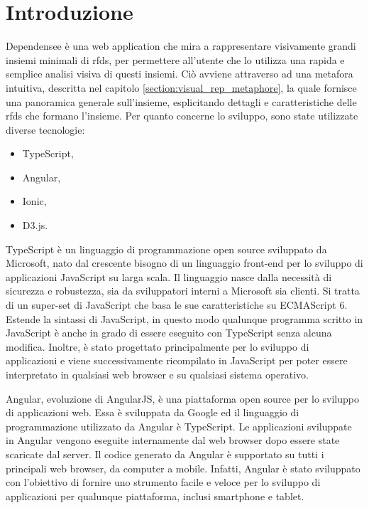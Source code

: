 \section{Introduzione} %
Dependensee \`{e} una web application che mira a rappresentare visivamente grandi insiemi minimali di \acrfull{rfds}, per permettere all'utente che lo utilizza una rapida e semplice analisi visiva di questi insiemi. Ci\`{o} avviene attraverso ad una metafora intuitiva, descritta nel capitolo \ref{section:visual_rep_metaphore}, la quale fornisce una panoramica generale sull'insieme, esplicitando dettagli e caratteristiche delle \acrfull{rfds} che formano l'insieme. Per quanto concerne lo sviluppo, sono state utilizzate diverse tecnologie:
\begin{itemize}
    \item TypeScript,
    \item Angular,
    \item Ionic,
    \item D3.js.
\end{itemize}
TypeScript \`{e} un linguaggio di programmazione open source sviluppato da Microsoft, nato dal crescente bisogno di un linguaggio front-end per lo sviluppo di applicazioni JavaScript su larga scala. Il linguaggio nasce dalla necessit\`{a} di sicurezza e robustezza, sia da sviluppatori interni a Microsoft sia clienti. Si tratta di un super-set di JavaScript che basa le sue caratteristiche su ECMAScript 6. Estende la sintassi di JavaScript, in questo modo qualunque programma scritto in JavaScript \`{e} anche in grado di essere eseguito con TypeScript senza alcuna modifica. Inoltre, \`{e} stato progettato principalmente per lo sviluppo di applicazioni e viene successivamente ricompilato in JavaScript per poter essere interpretato in qualsiasi web browser e su qualsiasi sistema operativo.\par
Angular, evoluzione di AngularJS, \`{e} una piattaforma open source per lo sviluppo di applicazioni web. Essa \`{e} sviluppata da Google ed il linguaggio di programmazione utilizzato da Angular \`{e} TypeScript. Le applicazioni sviluppate in Angular vengono eseguite internamente dal web browser dopo essere state scaricate dal server. Il codice generato da Angular \`{e} supportato su tutti i principali web browser, da computer a mobile. Infatti, Angular \`{e} stato sviluppato con l'obiettivo di fornire uno strumento facile e veloce per lo sviluppo di applicazioni per qualunque piattaforma, inclusi smartphone e tablet.\par
